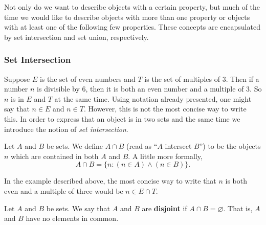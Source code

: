 Not only do we want to describe objects with a certain property, but much of the time we would like to describe objects with more than one property or objects with at least one of the following few properties. These concepts are encapsulated by set intersection and set union, respectively.

\subsubsection{Set Intersection}

Suppose $E$ is the set of even numbers and $T$ is the set of multiples of $3$. Then if a number $n$ is divisible by $6$, then it is both an even number and a multiple of $3$. So $n$ is in $E$ and $T$ at the same time. Using notation already presented, one might say that $n \in E$ and $n \in T$. However, this is not the most concise way to write this. In order to express that an object is in two sets and the same time we introduce the notion of \textit{set intersection}.

\begin{definition}
Let $A$ and $B$ be sets. We define $A \cap B$ (read as ``$A$ intersect $B$'') to be the objects $n$ which are contained in both $A$ and $B$. A little more formally,
\[A \cap B = \{n \colon (n \in A) \land (n \in B)\}.\]
\end{definition}

In the example described above, the most concise way to write that $n$ is both even and a multiple of three would be $n \in E \cap T$.

\begin{definition}
Let $A$ and $B$ be sets. We say that $A$ and $B$ are \textbf{disjoint} if $A \cap B = \varnothing$. That is, $A$ and $B$ have no elements in common.
\end{definition}


